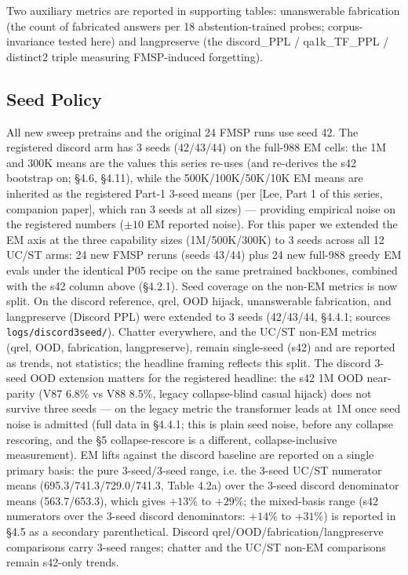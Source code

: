 \documentclass[11pt]{article}
\begin{document}
Two auxiliary metrics are reported in supporting tables: unanswerable fabrication (the count of fabricated answers per 18 abstention-trained probes; corpus-invariance tested here) and langpreserve (the discord\_PPL / qa1k\_TF\_PPL / distinct2 triple measuring FMSP-induced forgetting).

\subsection{Seed Policy}

All new sweep pretrains and the original 24 FMSP runs use seed 42. The registered discord arm has 3 seeds (42/43/44) on the full-988 EM cells: the 1M and 300K means are the values this series re-uses (and re-derives the s42 bootstrap on; \S4.6, \S4.11), while the 500K/100K/50K/10K EM means are inherited as the registered Part-1 3-seed means (per [Lee, Part 1 of this series, companion paper], which ran 3 seeds at all sizes) --- providing empirical noise on the registered numbers ($\pm 10$ EM reported noise). For this paper we extended the EM axis at the three capability sizes (1M/500K/300K) to 3 seeds across all 12 UC/ST arms: 24 new FMSP reruns (seeds 43/44) plus 24 new full-988 greedy EM evals under the identical P05 recipe on the same pretrained backbones, combined with the s42 column above (\S4.2.1). Seed coverage on the non-EM metrics is now split. On the discord reference, qrel, OOD hijack, unanswerable fabrication, and langpreserve (Discord PPL) were extended to 3 seeds (42/43/44, \S4.4.1; sources \texttt{logs/discord3seed/}). Chatter everywhere, and the UC/ST non-EM metrics (qrel, OOD, fabrication, langpreserve), remain single-seed (s42) and are reported as trends, not statistics; the headline framing reflects this split. The discord 3-seed OOD extension matters for the registered headline: the s42 1M OOD near-parity (V87 6.8\% vs V88 8.5\%, legacy collapse-blind casual hijack) does not survive three seeds --- on the legacy metric the transformer leads at 1M once seed noise is admitted (full data in \S4.4.1; this is plain seed noise, before any collapse rescoring, and the \S5 collapse-rescore is a different, collapse-inclusive measurement). EM lifts against the discord baseline are reported on a single primary basis: the pure 3-seed/3-seed range, i.e. the 3-seed UC/ST numerator means (695.3/741.3/729.0/741.3, Table 4.2a) over the 3-seed discord denominator means (563.7/653.3), which gives $+13\%$ to $+29\%$; the mixed-basis range (s42 numerators over the 3-seed discord denominators: $+14\%$ to $+31\%$) is reported in \S4.5 as a secondary parenthetical. Discord qrel/OOD/fabrication/langpreserve comparisons carry 3-seed ranges; chatter and the UC/ST non-EM comparisons remain s42-only trends.
\end{document}
